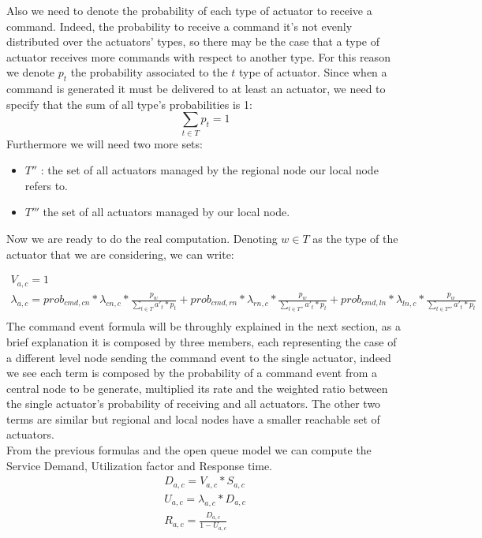 \documentclass[11pt]{article}
\begin{document}
Also we need to denote the probability of each type of actuator to receive a command. Indeed, the probability to receive a command it's not evenly distributed over the actuators' types, so there may be the case that a type of actuator receives more commands with respect to another type.
For this reason we denote $p_t$ the probability associated to the $t$ type of actuator.
Since when a command is generated it must be delivered to at least an actuator, we need to specify that the sum of all type's probabilities is 1:
\begin{equation}
    \sum_{t \in T}{p_t} = 1
\end{equation}
Furthermore we will need two more sets:
\begin{itemize}
\item $T''$ : the set of all actuators managed by the regional node our local node refers to.
\item $T'''$ the set of all actuators managed by our local node.
\end{itemize}
Now we are ready to do the real computation. Denoting $w \in T$ as the type of the actuator that we are considering, we can write:

\begin{equation}
	\begin{array}{l}
		V_{a,c} = 1 \\
		
		\lambda_{a, c} = prob_{cmd,cn} * \lambda_{cn, c} * \frac{p_{w}}{\sum\limits_{t \in T}{a'_{t} * p_{t}}} + prob_{cmd,rn} * \lambda_{rn, c} *\frac{p_{w}}{\sum\limits_{t \in T''}{a'_{t} * p_{t}}} + prob_{cmd,ln} * \lambda_{ln, c} * \frac{p_{w}}{\sum\limits_{t \in T'''}{a'_{t} * p_{t}}}   \\
	\end{array}
\end{equation}
The command event formula will be throughly explained in the next section, as a brief explanation it is composed by three members, each representing the case of a different level node sending the command event to the single actuator, indeed we see each term is composed by the probability of a command event from a central node to be generate, multiplied its rate and the weighted ratio between the single actuator's probability of receiving and all actuators. The other two terms are similar but regional and local nodes have a smaller reachable set of actuators.\\
From the previous formulas and the open queue model we can compute the Service Demand, Utilization factor and Response time.
\begin{equation}
	\begin{array}{l}
		D_{a, c} = V_{a, c} * S_{a, c} \\
		U_{a, c} = \lambda_{a, c} * D_{a, c} \\
		R_{a, c} = \frac{D_{a, c}}{1 - U_{a,c}} \\
	\end{array}
\end{equation}
\end{document}

